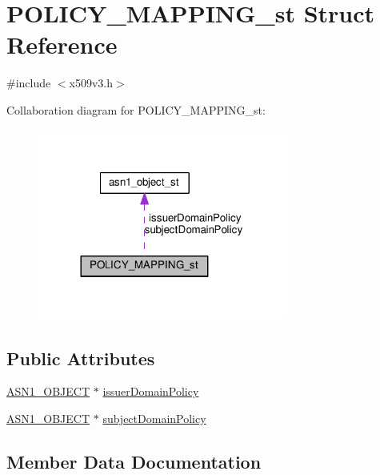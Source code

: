 \hypertarget{struct_p_o_l_i_c_y___m_a_p_p_i_n_g__st}{}\section{P\+O\+L\+I\+C\+Y\+\_\+\+M\+A\+P\+P\+I\+N\+G\+\_\+st Struct Reference}
\label{struct_p_o_l_i_c_y___m_a_p_p_i_n_g__st}


{\ttfamily \#include $<$x509v3.\+h$>$}



Collaboration diagram for P\+O\+L\+I\+C\+Y\+\_\+\+M\+A\+P\+P\+I\+N\+G\+\_\+st\+:
\nopagebreak
\begin{figure}[H]
\begin{center}
\leavevmode
\includegraphics[width=233pt]{struct_p_o_l_i_c_y___m_a_p_p_i_n_g__st__coll__graph}
\end{center}
\end{figure}
\subsection*{Public Attributes}
\begin{DoxyCompactItemize}
\item 
\hyperlink{asn1_8h_ae10c08e4e6b23f67a39b2add932ec48f}{A\+S\+N1\+\_\+\+O\+B\+J\+E\+CT} $\ast$ \hyperlink{struct_p_o_l_i_c_y___m_a_p_p_i_n_g__st_a426cb055da517faf080f42de138bead3}{issuer\+Domain\+Policy}
\item 
\hyperlink{asn1_8h_ae10c08e4e6b23f67a39b2add932ec48f}{A\+S\+N1\+\_\+\+O\+B\+J\+E\+CT} $\ast$ \hyperlink{struct_p_o_l_i_c_y___m_a_p_p_i_n_g__st_ad397a2367d90e97217ee96ff07ee5604}{subject\+Domain\+Policy}
\end{DoxyCompactItemize}


\subsection{Member Data Documentation}
